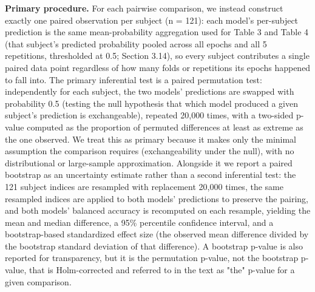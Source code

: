 \documentclass[a4paper,fleqn]{cas-sc}
\begin{document}
\textbf{Primary procedure.} For each pairwise comparison, we instead construct exactly one paired observation per subject (n = 121): each model's per-subject prediction is the same mean-probability aggregation used for Table 3 and Table 4 (that subject's predicted probability pooled across all epochs and all 5 repetitions, thresholded at 0.5; Section 3.14), so every subject contributes a single paired data point regardless of how many folds or repetitions its epochs happened to fall into. The primary inferential test is a paired permutation test: independently for each subject, the two models' predictions are swapped with probability 0.5 (testing the null hypothesis that which model produced a given subject's prediction is exchangeable), repeated 20,000 times, with a two-sided p-value computed as the proportion of permuted differences at least as extreme as the one observed. We treat this as primary because it makes only the minimal assumption the comparison requires (exchangeability under the null), with no distributional or large-sample approximation. Alongside it we report a paired bootstrap as an uncertainty estimate rather than a second inferential test: the 121 subject indices are resampled with replacement 20,000 times, the same resampled indices are applied to both models' predictions to preserve the pairing, and both models' balanced accuracy is recomputed on each resample, yielding the mean and median difference, a 95\% percentile confidence interval, and a bootstrap-based standardized effect size (the observed mean difference divided by the bootstrap standard deviation of that difference). A bootstrap p-value is also reported for transparency, but it is the permutation p-value, not the bootstrap p-value, that is Holm-corrected and referred to in the text as "the" p-value for a given comparison.
\end{document}
